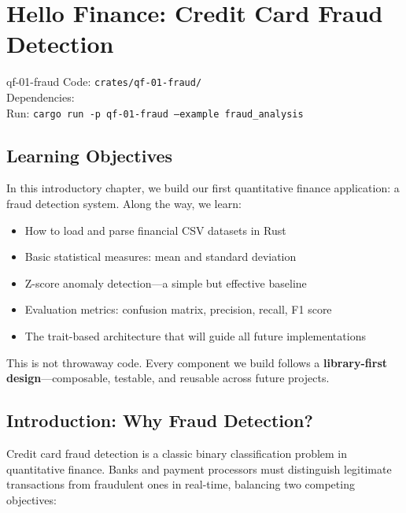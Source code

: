 \chapter{Hello Finance: Credit Card Fraud Detection}
\label{ch:fraud}

\begin{companioncode}{qf-01-fraud}
Code: \texttt{crates/qf-01-fraud/}\\
Dependencies: \\
Run: \texttt{cargo run -p qf-01-fraud --example fraud\_analysis}
\end{companioncode}

\section{Learning Objectives}

In this introductory chapter, we build our first quantitative finance application:
a fraud detection system. Along the way, we learn:

\begin{itemize}
    \item How to load and parse financial CSV datasets in Rust
    \item Basic statistical measures: mean and standard deviation
    \item Z-score anomaly detection---a simple but effective baseline
    \item Evaluation metrics: confusion matrix, precision, recall, F1 score
    \item The trait-based architecture that will guide all future implementations
\end{itemize}

\begin{keyinsight}
This is not throwaway code. Every component we build follows a \textbf{library-first design}---composable, testable, and reusable across future projects.
\end{keyinsight}

\section{Introduction: Why Fraud Detection?}


Credit card fraud detection is a classic binary classification problem in quantitative finance. Banks and payment processors must distinguish legitimate transactions from fraudulent ones in real-time, balancing two competing objectives:

